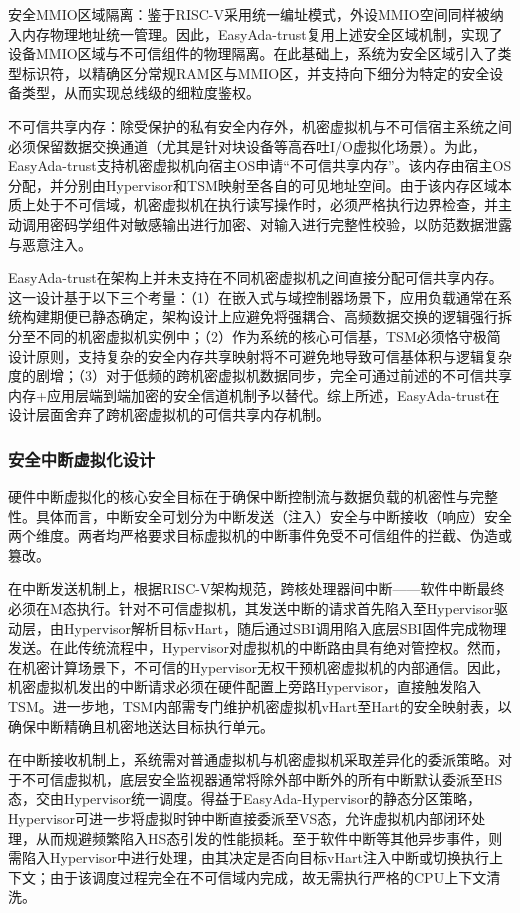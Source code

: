 \documentclass[master, vlined, review]{DissertUESTC}
\begin{document}
	安全MMIO区域隔离：鉴于RISC-V采用统一编址模式，外设MMIO空间同样被纳入内存物理地址统一管理。因此，EasyAda-trust复用上述安全区域机制，实现了设备MMIO区域与不可信组件的物理隔离。在此基础上，系统为安全区域引入了类型标识符，以精确区分常规RAM区与MMIO区，并支持向下细分为特定的安全设备类型，从而实现总线级的细粒度鉴权。
	
	不可信共享内存：除受保护的私有安全内存外，机密虚拟机与不可信宿主系统之间必须保留数据交换通道（尤其是针对块设备等高吞吐I/O虚拟化场景）。为此，EasyAda-trust支持机密虚拟机向宿主OS申请“不可信共享内存”。该内存由宿主OS分配，并分别由Hypervisor和TSM映射至各自的可见地址空间。由于该内存区域本质上处于不可信域，机密虚拟机在执行读写操作时，必须严格执行边界检查，并主动调用密码学组件对敏感输出进行加密、对输入进行完整性校验，以防范数据泄露与恶意注入。
	
	EasyAda-trust在架构上并未支持在不同机密虚拟机之间直接分配可信共享内存。这一设计基于以下三个考量：（1）在嵌入式与域控制器场景下，应用负载通常在系统构建期便已静态确定，架构设计上应避免将强耦合、高频数据交换的逻辑强行拆分至不同的机密虚拟机实例中；（2）作为系统的核心可信基，TSM必须恪守极简设计原则，支持复杂的安全内存共享映射将不可避免地导致可信基体积与逻辑复杂度的剧增；（3）对于低频的跨机密虚拟机数据同步，完全可通过前述的不可信共享内存+应用层端到端加密的安全信道机制予以替代。综上所述，EasyAda-trust在设计层面舍弃了跨机密虚拟机的可信共享内存机制。
	
	\subsubsection{安全中断虚拟化设计}
	硬件中断虚拟化的核心安全目标在于确保中断控制流与数据负载的机密性与完整性。具体而言，中断安全可划分为中断发送（注入）安全与中断接收（响应）安全两个维度。两者均严格要求目标虚拟机的中断事件免受不可信组件的拦截、伪造或篡改。
	
	在中断发送机制上，根据RISC-V架构规范，跨核处理器间中断——软件中断最终必须在M态执行。针对不可信虚拟机，其发送中断的请求首先陷入至Hypervisor驱动层，由Hypervisor解析目标vHart，随后通过SBI调用陷入底层SBI固件完成物理发送。在此传统流程中，Hypervisor对虚拟机的中断路由具有绝对管控权。然而，在机密计算场景下，不可信的Hypervisor无权干预机密虚拟机的内部通信。因此，机密虚拟机发出的中断请求必须在硬件配置上旁路Hypervisor，直接触发陷入TSM。进一步地，TSM内部需专门维护机密虚拟机vHart至Hart的安全映射表，以确保中断精确且机密地送达目标执行单元。
	
	在中断接收机制上，系统需对普通虚拟机与机密虚拟机采取差异化的委派策略。对于不可信虚拟机，底层安全监视器通常将除外部中断外的所有中断默认委派至HS态，交由Hypervisor统一调度。得益于EasyAda-Hypervisor的静态分区策略，Hypervisor可进一步将虚拟时钟中断直接委派至VS态，允许虚拟机内部闭环处理，从而规避频繁陷入HS态引发的性能损耗。至于软件中断等其他异步事件，则需陷入Hypervisor中进行处理，由其决定是否向目标vHart注入中断或切换执行上下文；由于该调度过程完全在不可信域内完成，故无需执行严格的CPU上下文清洗。
	
\end{document}
